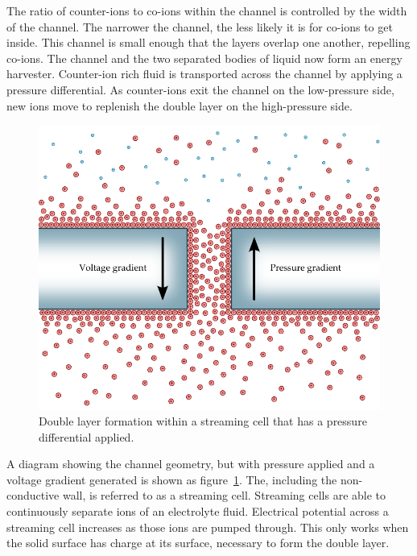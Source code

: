   The ratio of counter-ions to co-ions within the channel is controlled by the width of the channel.
  The narrower the channel, the less likely it is for co-ions to get inside.
  This channel is small enough that the layers overlap one another, repelling co-ions.
  The channel and the two separated bodies of liquid now form an energy harvester.
  Counter-ion rich fluid is transported across the channel by applying a pressure differential.
  As counter-ions exit the channel on the low-pressure side, new ions move to replenish the double layer on the high-pressure side.
  \begin{figure}
      \centering
      \includegraphics{content/pt1/01-PowerHarvesting/graphics/intro_2_channel}
      \caption{\label{fig:doubleLayerInChannel_withPressure}Double layer formation within a streaming cell that has a pressure differential applied.}
  \end{figure}
  A diagram showing the channel geometry, but with pressure applied and a voltage gradient generated is shown as figure~\ref{fig:doubleLayerInChannel_withPressure}.
  The, including the non-conductive wall, is referred to as a streaming cell.
  Streaming cells are able to continuously separate ions of an electrolyte fluid.
  Electrical potential across a streaming cell increases as those ions are pumped through.
  This only works when the solid surface has charge at its surface, necessary to form the double layer.

